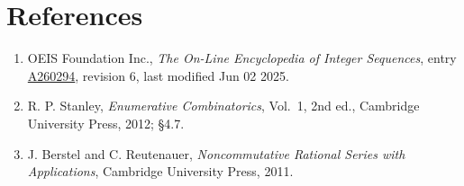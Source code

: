 \documentclass[11pt]{article}
\theoremstyle{definition}
\begin{document}
\section{References}

\begin{enumerate}

\item OEIS Foundation Inc., \emph{The On-Line Encyclopedia of Integer Sequences}, entry \href{https://oeis.org/A260294}{A260294}, revision 6, last modified Jun 02 2025.

\item R. P. Stanley, \emph{Enumerative Combinatorics}, Vol.~1, 2nd ed., Cambridge University Press, 2012; \S4.7.

\item J. Berstel and C. Reutenauer, \emph{Noncommutative Rational Series with Applications}, Cambridge University Press, 2011.

\end{enumerate}
\end{document}
